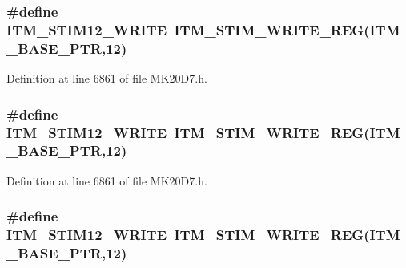 \subsubsection[{\texorpdfstring{I\+T\+M\+\_\+\+S\+T\+I\+M12\+\_\+\+W\+R\+I\+TE}{ITM_STIM12_WRITE}}]{\setlength{\rightskip}{0pt plus 5cm}\#define I\+T\+M\+\_\+\+S\+T\+I\+M12\+\_\+\+W\+R\+I\+TE~{\bf I\+T\+M\+\_\+\+S\+T\+I\+M\+\_\+\+W\+R\+I\+T\+E\+\_\+\+R\+EG}({\bf I\+T\+M\+\_\+\+B\+A\+S\+E\+\_\+\+P\+TR},12)}\hypertarget{group___i_t_m___register___accessor___macros_ga61fb646c29b6f56928ca4e570b1e4167}{}\label{group___i_t_m___register___accessor___macros_ga61fb646c29b6f56928ca4e570b1e4167}


Definition at line 6861 of file M\+K20\+D7.\+h.

\subsubsection[{\texorpdfstring{I\+T\+M\+\_\+\+S\+T\+I\+M12\+\_\+\+W\+R\+I\+TE}{ITM_STIM12_WRITE}}]{\setlength{\rightskip}{0pt plus 5cm}\#define I\+T\+M\+\_\+\+S\+T\+I\+M12\+\_\+\+W\+R\+I\+TE~{\bf I\+T\+M\+\_\+\+S\+T\+I\+M\+\_\+\+W\+R\+I\+T\+E\+\_\+\+R\+EG}({\bf I\+T\+M\+\_\+\+B\+A\+S\+E\+\_\+\+P\+TR},12)}\hypertarget{group___i_t_m___register___accessor___macros_ga61fb646c29b6f56928ca4e570b1e4167}{}\label{group___i_t_m___register___accessor___macros_ga61fb646c29b6f56928ca4e570b1e4167}


Definition at line 6861 of file M\+K20\+D7.\+h.

\subsubsection[{\texorpdfstring{I\+T\+M\+\_\+\+S\+T\+I\+M12\+\_\+\+W\+R\+I\+TE}{ITM_STIM12_WRITE}}]{\setlength{\rightskip}{0pt plus 5cm}\#define I\+T\+M\+\_\+\+S\+T\+I\+M12\+\_\+\+W\+R\+I\+TE~{\bf I\+T\+M\+\_\+\+S\+T\+I\+M\+\_\+\+W\+R\+I\+T\+E\+\_\+\+R\+EG}({\bf I\+T\+M\+\_\+\+B\+A\+S\+E\+\_\+\+P\+TR},12)}\hypertarget{group___i_t_m___register___accessor___macros_ga61fb646c29b6f56928ca4e570b1e4167}{}\label{group___i_t_m___register___accessor___macros_ga61fb646c29b6f56928ca4e570b1e4167}


